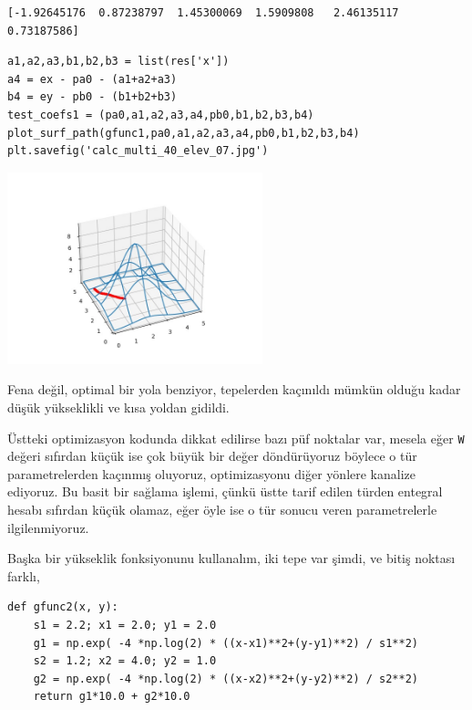 \documentclass[12pt,fleqn]{article}\usepackage{../../common}
\begin{document}
\begin{verbatim}
[-1.92645176  0.87238797  1.45300069  1.5909808   2.46135117  0.73187586]
\end{verbatim}

\begin{verbatim}
a1,a2,a3,b1,b2,b3 = list(res['x'])
a4 = ex - pa0 - (a1+a2+a3)
b4 = ey - pb0 - (b1+b2+b3)
test_coefs1 = (pa0,a1,a2,a3,a4,pb0,b1,b2,b3,b4)
plot_surf_path(gfunc1,pa0,a1,a2,a3,a4,pb0,b1,b2,b3,b4)
plt.savefig('calc_multi_40_elev_07.jpg')
\end{verbatim}

\includegraphics[width=20em]{calc_multi_40_elev_07.jpg}

Fena değil, optimal bir yola benziyor, tepelerden kaçınıldı mümkün olduğu kadar
düşük yükseklikli ve kısa yoldan gidildi.

Üstteki optimizasyon kodunda dikkat edilirse bazı püf noktalar var, mesela eğer
\verb!W! değeri sıfırdan küçük ise çok büyük bir değer döndürüyoruz böylece o
tür parametrelerden kaçınmış oluyoruz, optimizasyonu diğer yönlere kanalize
ediyoruz. Bu basit bir sağlama işlemi, çünkü üstte tarif edilen türden entegral
hesabı sıfırdan küçük olamaz, eğer öyle ise o tür sonucu veren parametrelerle
ilgilenmiyoruz.


Başka bir yükseklik fonksiyonunu kullanalım, iki tepe var şimdi, ve
bitiş noktası farklı,

\begin{verbatim}
def gfunc2(x, y):
    s1 = 2.2; x1 = 2.0; y1 = 2.0
    g1 = np.exp( -4 *np.log(2) * ((x-x1)**2+(y-y1)**2) / s1**2)
    s2 = 1.2; x2 = 4.0; y2 = 1.0
    g2 = np.exp( -4 *np.log(2) * ((x-x2)**2+(y-y2)**2) / s2**2)
    return g1*10.0 + g2*10.0
\end{verbatim}
\end{document}

